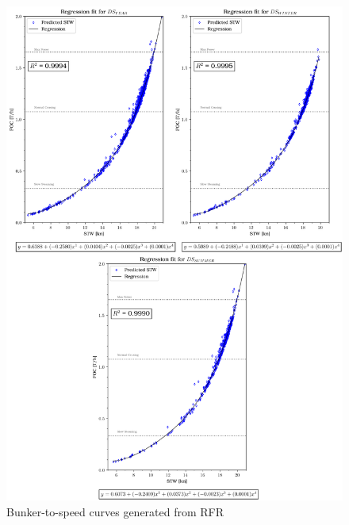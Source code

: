 \newpage

\begin{figure}[h!]
    \centering
    \includegraphics[width=.9\linewidth]{02_figures/poly_rfr_combi.png}
    \caption{Bunker-to-speed curves generated from RFR}
    \label{fig:FOC_plot_rfr_combi}
\end{figure}

\newpage

